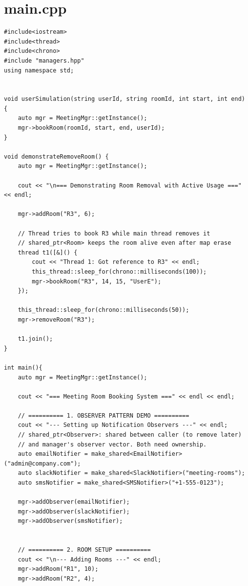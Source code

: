 \documentclass[11pt,a4paper]{article}
\begin{document}
\newpage
\section{main.cpp}
\begin{lstlisting}[title={\texttt{main.cpp}}]
#include<iostream>
#include<thread>
#include<chrono>
#include "managers.hpp"
using namespace std;


void userSimulation(string userId, string roomId, int start, int end) {
    auto mgr = MeetingMgr::getInstance();
    mgr->bookRoom(roomId, start, end, userId);
}

void demonstrateRemoveRoom() {
    auto mgr = MeetingMgr::getInstance();
    
    cout << "\n=== Demonstrating Room Removal with Active Usage ===" << endl;
    
    mgr->addRoom("R3", 6);
    
    // Thread tries to book R3 while main thread removes it
    // shared_ptr<Room> keeps the room alive even after map erase
    thread t1([&]() {
        cout << "Thread 1: Got reference to R3" << endl;
        this_thread::sleep_for(chrono::milliseconds(100));
        mgr->bookRoom("R3", 14, 15, "UserE");
    });
    
    this_thread::sleep_for(chrono::milliseconds(50));
    mgr->removeRoom("R3");
    
    t1.join();
}

int main(){
    auto mgr = MeetingMgr::getInstance();

    cout << "=== Meeting Room Booking System ===" << endl << endl;
    
    // ========== 1. OBSERVER PATTERN DEMO ==========
    cout << "--- Setting up Notification Observers ---" << endl;
    // shared_ptr<Observer>: shared between caller (to remove later)
    // and manager's observer vector. Both need ownership.
    auto emailNotifier = make_shared<EmailNotifier>("admin@company.com");
    auto slackNotifier = make_shared<SlackNotifier>("meeting-rooms");
    auto smsNotifier = make_shared<SMSNotifier>("+1-555-0123");
    
    mgr->addObserver(emailNotifier);
    mgr->addObserver(slackNotifier);
    mgr->addObserver(smsNotifier);
    
    
    // ========== 2. ROOM SETUP ==========
    cout << "\n--- Adding Rooms ---" << endl;
    mgr->addRoom("R1", 10);
    mgr->addRoom("R2", 4);
    

\end{lstlisting}
\end{document}
